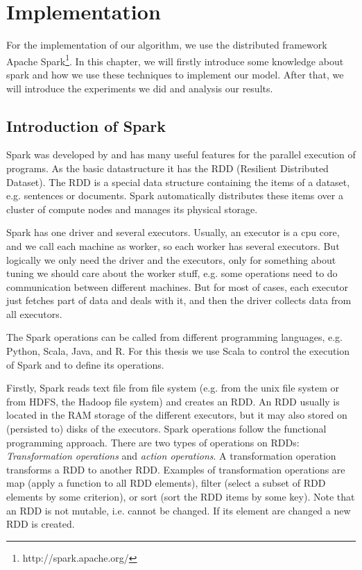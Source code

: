 \chapter{Implementation}
\label{cha:implementation}

For the implementation of our algorithm, we use the distributed framework Apache Spark\footnote{http://spark.apache.org/}. In this chapter, we will firstly introduce some knowledge about spark and how we use these techniques to implement our model. After that, we will introduce the experiments we did and analysis our results.


\section{Introduction of Spark}


Spark was developed by \cite{ZahariaChowdhuryEtAl2010} and has many useful features for the parallel execution of programs. As the basic datastructure it has the 
\gls{RDD} %
(Resilient Distributed Dataset). The RDD is a special data structure containing the items of a dataset, e.g. sentences or documents. Spark automatically distributes these items over a cluster of compute nodes and manages its physical storage. 

Spark has one driver and several executors. Usually, an executor is a cpu core, and we call each machine as worker, so each worker has several executors. But logically we only need the driver and the executors, only for something about tuning we should care about the worker stuff, e.g. some operations need to do communication between different machines. But for most of cases, each executor just fetches part of data and deals with it, and then the driver collects data from all executors.

The Spark operations can be called from different programming languages, e.g. Python, Scala, Java, and R. For this thesis we use Scala to control the execution of Spark and to define its operations.

Firstly, Spark reads text file from file system (e.g. from the unix file system or from HDFS, the Hadoop file system) and creates an RDD. An RDD usually is located in the RAM storage of the different executors, but it may also stored on (persisted to) disks of the executors. Spark operations follow the functional programming approach. There are two types of operations on RDDs: \emph{Transformation operations} and \emph{action operations}.  A transformation operation transforms  a RDD to another RDD. Examples of transformation operations are map (apply a function to all RDD elements), filter (select a subset of RDD elements by some criterion), or sort (sort the RDD items by some key). Note that an RDD is not mutable, i.e. cannot be changed. If its element are changed a new RDD is created. 

